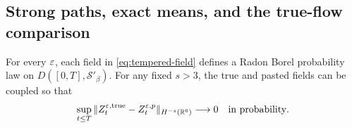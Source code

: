 \subsection{Strong paths, exact means, and the true-flow comparison}

\begin{lemma}\label{lem:tempered-realization}
For every $\varepsilon$, each field in \eqref{eq:tempered-field} defines a
Radon Borel probability law on $D([0,T],\mathcal S'_\beta)$.
For any fixed $s>3$, the true and pasted fields can be coupled so that
\begin{equation}\label{eq:tempered-coupling}
 \sup_{t\leq T}\|Z_t^{\varepsilon,\mathrm{true}}-Z_t^{\varepsilon,p}\|_{H^{-s}(\mathbb R^6)}
       \longrightarrow0\quad\hbox{in probability}.
\end{equation}
\end{lemma}
